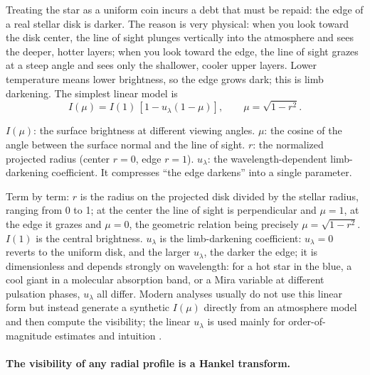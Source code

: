Treating the star as a uniform coin incurs a debt that must be repaid: the edge of a real stellar disk is darker. The reason is very physical: when you look toward the disk center, the line of sight plunges vertically into the atmosphere and sees the deeper, hotter layers; when you look toward the edge, the line of sight grazes at a steep angle and sees only the shallower, cooler upper layers. Lower temperature means lower brightness, so the edge grows dark; this is limb darkening. The simplest linear model is
\begin{equation}
  I(\mu)=I(1)\,[1-u_\lambda(1-\mu)],
  \qquad
  \mu=\sqrt{1-r^2}.
  \label{eq:e17-linear-ld}
\end{equation}
\begin{formulaexplain}
\(I(\mu)\): the surface brightness at different viewing angles. \(\mu\): the cosine of the angle between the surface normal and the line of sight. \(r\): the normalized projected radius (center \(r=0\), edge \(r=1\)). \(u_\lambda\): the wavelength-dependent limb-darkening coefficient. It compresses ``the edge darkens'' into a single parameter.
\end{formulaexplain}
Term by term: \(r\) is the radius on the projected disk divided by the stellar radius, ranging from 0 to 1; at the center the line of sight is perpendicular and \(\mu=1\), at the edge it grazes and \(\mu=0\), the geometric relation being precisely \(\mu=\sqrt{1-r^2}\). \(I(1)\) is the central brightness. \(u_\lambda\) is the limb-darkening coefficient: \(u_\lambda=0\) reverts to the uniform disk, and the larger \(u_\lambda\), the darker the edge; it is dimensionless and depends strongly on wavelength: for a hot star in the blue, a cool giant in a molecular absorption band, or a Mira variable at different pulsation phases, \(u_\lambda\) all differ. Modern analyses usually do not use this linear form but instead generate a synthetic \(I(\mu)\) directly from an atmosphere model and then compute the visibility; the linear \(u_\lambda\) is used mainly for order-of-magnitude estimates and intuition \citep{1974MNRAS.167..475H,1992A&A...259..227D,1997A&A...327..199H,2015MNRAS.453.3821P}.

\paragraph{The visibility of any radial profile is a Hankel transform.}
\label{sec:e17-hankel}

